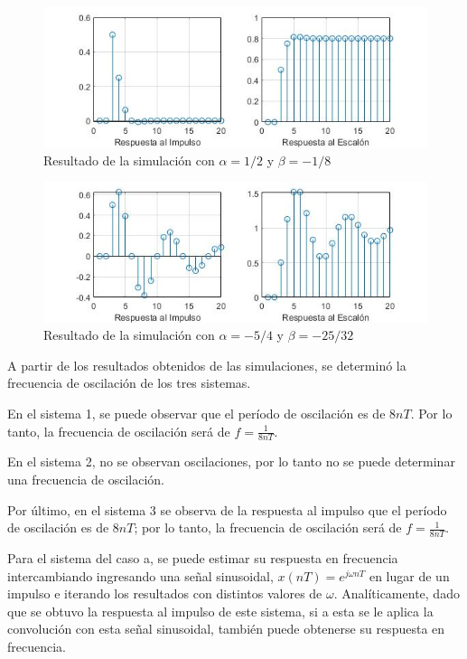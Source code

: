 \begin{figure}
    \centering
    \includegraphics[width=\linewidth]{sim9b.jpg}
    \caption{Resultado de la simulación con $\alpha=1/2$ y $\beta=-1/8$}
    \label{fig:9b}
\end{figure}

\begin{figure}
    \centering
    \includegraphics[width=\linewidth]{sim9c.jpg}
    \caption{Resultado de la simulación con $\alpha=-5/4$ y $\beta=-25/32$}
    \label{fig:9c}
\end{figure}

A partir de los resultados obtenidos de las simulaciones, se determinó la frecuencia de oscilación de los tres sistemas.

En el sistema 1, se puede observar que el período de oscilación es de $8 nT$. Por lo tanto, la frecuencia de oscilación será de $f=\frac{1}{8nT}$.

En el sistema 2, no se observan oscilaciones, por lo tanto no se puede determinar una frecuencia de oscilación.

Por último, en el sistema 3 se observa de la respuesta al impulso que el período de oscilación es de $8nT$; por lo tanto, la frecuencia de oscilación será de $f=\frac{1}{8nT}$.

Para el sistema del caso a, se puede estimar su respuesta en frecuencia intercambiando ingresando una señal sinusoidal, $x(nT) = e^{j\omega nT}$ en lugar de un impulso e iterando los resultados con distintos valores de $\omega$. Analíticamente, dado que se obtuvo la respuesta al impulso de este sistema, si a esta se le aplica la convolución con esta señal sinusoidal, también puede obtenerse su respuesta en frecuencia.